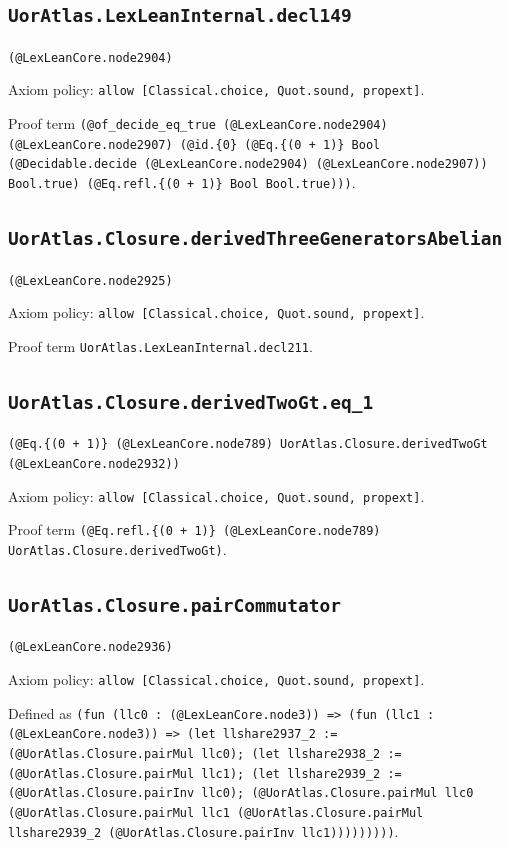 \documentclass[11pt]{article}
\begin{document}
\subsection*{\texttt{UorAtlas.LexLeanInternal.decl149}}
\noindent\texttt{(@LexLeanCore.node2904)}\par
\noindent Axiom policy: \texttt{allow [Classical.choice, Quot.sound, propext]}.\par
\noindent Proof term \texttt{(@of\_decide\_eq\_true (@LexLeanCore.node2904) (@LexLeanCore.node2907) (@id.\{0\} (@Eq.\{(0 + 1)\} Bool (@Decidable.decide (@LexLeanCore.node2904) (@LexLeanCore.node2907)) Bool.true) (@Eq.refl.\{(0 + 1)\} Bool Bool.true)))}.\par
\subsection*{\texttt{UorAtlas.Closure.derivedThreeGeneratorsAbelian}}
\noindent\texttt{(@LexLeanCore.node2925)}\par
\noindent Axiom policy: \texttt{allow [Classical.choice, Quot.sound, propext]}.\par
\noindent Proof term \texttt{UorAtlas.LexLeanInternal.decl211}.\par
\subsection*{\texttt{UorAtlas.Closure.derivedTwoGt.eq\_1}}
\noindent\texttt{(@Eq.\{(0 + 1)\} (@LexLeanCore.node789) UorAtlas.Closure.derivedTwoGt (@LexLeanCore.node2932))}\par
\noindent Axiom policy: \texttt{allow [Classical.choice, Quot.sound, propext]}.\par
\noindent Proof term \texttt{(@Eq.refl.\{(0 + 1)\} (@LexLeanCore.node789) UorAtlas.Closure.derivedTwoGt)}.\par
\subsection*{\texttt{UorAtlas.Closure.pairCommutator}}
\noindent\texttt{(@LexLeanCore.node2936)}\par
\noindent Axiom policy: \texttt{allow [Classical.choice, Quot.sound, propext]}.\par
\noindent Defined as \texttt{(fun (llc0 : (@LexLeanCore.node3)) => (fun (llc1 : (@LexLeanCore.node3)) => (let llshare2937\_2 := (@UorAtlas.Closure.pairMul llc0); (let llshare2938\_2 := (@UorAtlas.Closure.pairMul llc1); (let llshare2939\_2 := (@UorAtlas.Closure.pairInv llc0); (@UorAtlas.Closure.pairMul llc0 (@UorAtlas.Closure.pairMul llc1 (@UorAtlas.Closure.pairMul llshare2939\_2 (@UorAtlas.Closure.pairInv llc1)))))))))}.\par
\end{document}
